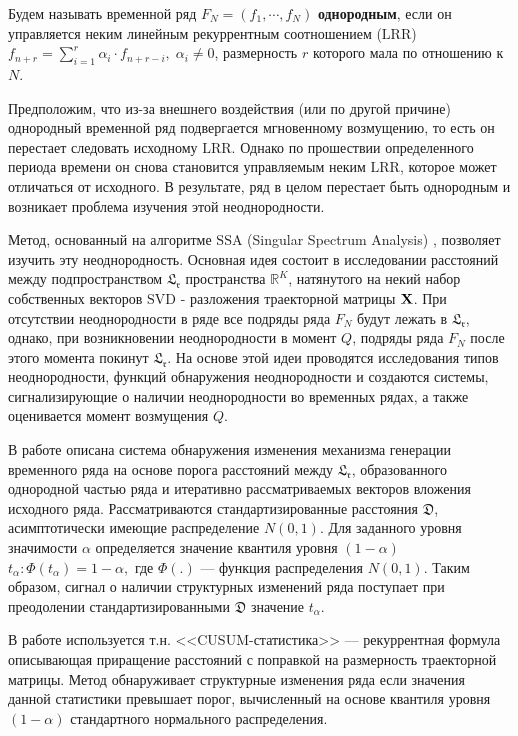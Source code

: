 \documentclass[specialist, substylefile = spbu.rtx,
			   subf, href, 12pt]{disser}
\begin{document}
\intro
Будем называть временной ряд $F_N = (f_1, \cdots, f_{N})$ \textbf{однородным}, если он управляется неким линейным рекуррентным соотношением ($\mathrm{LRR}$) $f_{n+r} = \sum_{i=1}^{r} \alpha_i\cdot f_{n+r-i}, \; \alpha_i \neq 0$, размерность $ r $ которого мала по отношению к $N$. 

Предположим, что из-за внешнего воздействия (или по другой причине) однородный временной ряд подвергается мгновенному возмущению, то есть он перестает следовать исходному $\mathrm{LRR}$. Однако по прошествии определенного периода времени он снова становится управляемым неким $\mathrm{LRR}$, которое может отличаться от исходного. В результате, ряд в целом перестает быть однородным и возникает проблема изучения этой неоднородности.

Метод, основанный на алгоритме $ \mathrm{SSA} $ (Singular Spectrum Analysis) \cite{Golyandina2001, rssa_package, RSSA_BASIC}, позволяет изучить эту неоднородность. Основная идея состоит в исследовании расстояний между подпространством $ \mathfrak{L_r} $ пространства $ \mathbb{R}^K $, натянутого на некий набор собственных векторов $ \mathrm{SVD} $ - разложения траекторной матрицы $ \bold{X} $. При отсутствии неоднородности в ряде все подряды ряда $ F_N $ будут лежать в $ \mathfrak{L_r} $, однако, при возникновении неоднородности в момент $ Q $, подряды ряда $ F_N $ после этого момента покинут $ \mathfrak{L_r} $. На основе этой идеи проводятся исследования типов неоднородности, функций обнаружения неоднородности и создаются системы, сигнализирующие о наличии неоднородности во временных рядах, а также оценивается момент возмущения $ Q $.

В работе \cite{Moskvina2010ChangeP} описана система обнаружения изменения механизма генерации временного ряда на основе порога расстояний между $ \mathfrak{L_r} $, образованного однородной частью ряда и итеративно рассматриваемых векторов вложения исходного ряда. Рассматриваются стандартизированные расстояния $ \mathfrak{D} $, асимптотически имеющие распределение $ N(0, 1)$. Для заданного уровня значимости $ \alpha $ определяется значение квантиля уровня $ (1-\alpha) $ $ t_\alpha: \Phi(t_\alpha) = 1 - \alpha, $ где $ \Phi(.) $ --- функция распределения $ N(0, 1) $. Таким образом, сигнал о наличии структурных изменений ряда поступает при преодолении стандартизированными $ \mathfrak{D} $ значение $ t_\alpha $. 

В работе \cite{CPD} используется т.н. <<CUSUM-статистика>> --- рекуррентная формула описывающая приращение расстояний с поправкой на размерность траекторной матрицы. Метод обнаруживает структурные изменения ряда если значения данной статистики превышает порог, вычисленный на основе квантиля уровня $ (1 - \alpha) $ стандартного нормального распределения.
\end{document}
